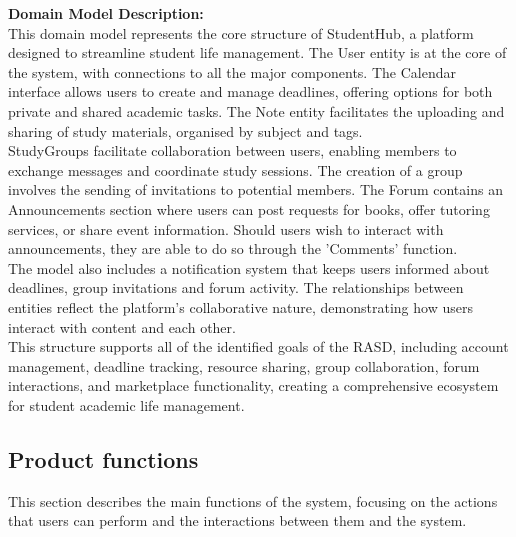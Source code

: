 \documentclass{article}
\begin{document}
\textbf{Domain Model Description:}\\
This domain model represents the core structure of StudentHub, a platform designed to streamline student life management. The User entity is at the core of the system, with connections to all the major components. The Calendar interface allows users to create and manage deadlines, offering options for both private and shared academic tasks. The Note entity facilitates the uploading and sharing of study materials, organised by subject and tags.
\\
StudyGroups facilitate collaboration between users, enabling members to exchange messages and coordinate study sessions. The creation of a group involves the sending of invitations to potential members. The Forum contains an Announcements section where users can post requests for books, offer tutoring services, or share event information. Should users wish to interact with announcements, they are able to do so through the 'Comments' function.
\\
The model also includes a notification system that keeps users informed about deadlines, group invitations and forum activity. The relationships between entities reflect the platform's collaborative nature, demonstrating how users interact with content and each other.
\\
This structure supports all of the identified goals of the RASD, including account management, deadline tracking, resource sharing, group collaboration, forum interactions, and marketplace functionality, creating a comprehensive ecosystem for student academic life management.






\clearpage
\subsection{Product functions}
This section describes the main functions of the system, focusing on the actions that users can perform and the interactions between them and the system.
\end{document}
